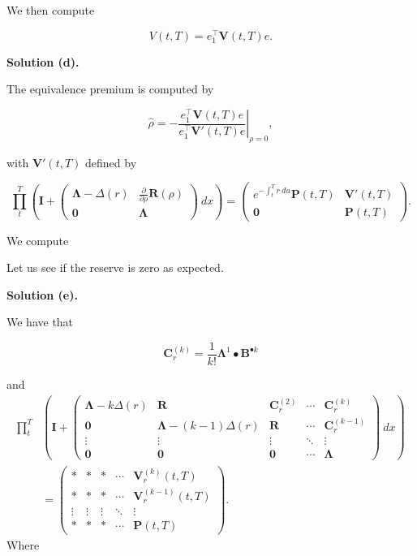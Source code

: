 \documentclass[a4paper,12pt,openany]{book}
\begin{document}
We then compute

\[
V(t,T)=e_1^\top \mathbf V(t,T)e.
\]

\textbf{Solution (d).}

The equivalence premium is computed by

\[
\hat \rho = \left.-\frac{e_1^\top \mathbf V(t,T)e}{e_1^\top \mathbf V'(t,T)e}\right\vert_{\rho=0},
\]

with \(\mathbf V'(t,T)\) defined by

\[
\prod_t^T\left(\mathbf I+\begin{pmatrix}
\mathbf \Lambda-\Delta(r) &\frac{\partial}{\partial \rho} \mathbf R(\rho)\\
\mathbf 0 & \mathbf \Lambda
\end{pmatrix}\ dx\right)=
\begin{pmatrix}
e^{-\int_t^Tr\ du}\mathbf P(t,T) & \mathbf V'(t,T)\\
\mathbf 0 & \mathbf P(t,T)
\end{pmatrix}.
\]

We compute

Let us see if the reserve is zero as expected.

\textbf{Solution (e).}

We have that

\[
\mathbf C_r^{(k)}=\frac{1}{k!}\mathbf\Lambda^1\bullet \mathbf B^{\bullet k}
\]

and
\begin{align*}
\prod_t^T&\left(\mathbf I+\begin{pmatrix}
\mathbf \Lambda-k\Delta(r) & \mathbf R & \mathbf C_r^{(2)} & \cdots & \mathbf C_r^{(k)}\\
\mathbf 0 & \mathbf \Lambda - (k-1)\Delta(r) & \mathbf R & \cdots & \mathbf C_r^{(k-1)}\\
\vdots & \vdots & \vdots & \ddots & \vdots \\
\mathbf 0 & \mathbf 0 & \mathbf 0 & \cdots & \mathbf \Lambda
\end{pmatrix}\ dx\right)\\
&=
\begin{pmatrix}
* & * & * & \cdots & \mathbf V_r^{(k)}(t,T)\\
* & * & * & \cdots & \mathbf V_r^{(k-1)}(t,T)\\
\vdots & \vdots & \vdots & \ddots & \vdots \\
* & * &* & \cdots &  \mathbf P(t,T)
\end{pmatrix}.
\end{align*}
Where
\end{document}
